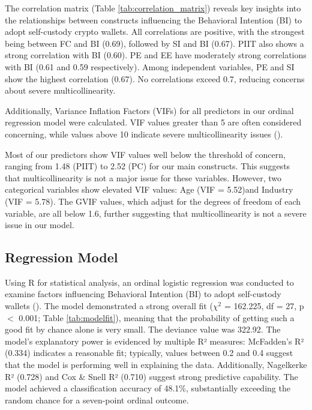 \documentclass[twocolumn]{article}
\begin{document}
The correlation matrix (Table \ref{tab:correlation_matrix}) reveals key insights into the relationships between constructs influencing the Behavioral Intention (BI) to adopt self-custody crypto wallets. All correlations are positive, with the strongest being between FC and BI (0.69), followed by SI and BI (0.67). PIIT also shows a strong correlation with BI (0.60). PE and EE have moderately strong correlations with BI (0.61 and 0.59 respectively). Among independent variables, PE and SI show the highest correlation (0.67). No correlations exceed 0.7, reducing concerns about severe multicollinearity. 

Additionally, Variance Inflation Factors (VIFs) for all predictors in our ordinal regression model were calculated. VIF values greater than 5 are often considered concerning, while values above 10 indicate severe multicollinearity issues  (\cite{cohen_applied_2003}).

Most of our predictors show VIF values well below the threshold of concern, ranging from 1.48 (PIIT) to 2.52 (PC) for our main constructs. This suggests that multicollinearity is not a major issue for these variables.
However, two categorical variables show elevated VIF values: Age (VIF = 5.52)and Industry (VIF = 5.78). The GVIF values, which adjust for the degrees of freedom of each variable, are all below 1.6, further suggesting that multicollinearity is not a severe issue in our model.


\subsection{Regression Model}

Using R for statistical analysis, an ordinal logistic regression was conducted to examine factors influencing Behavioral Intention (BI) to adopt self-custody wallets  (\cite{christensen_ordinal_2023, venables_modern_2010}). The model demonstrated a strong overall fit ($\chi^2$ = 162.225, df = 27, p $<$ 0.001; Table \ref{tab:modelfit}), meaning that the probability of getting such a good fit by chance alone is very small. The deviance value was 322.92. The model's explanatory power is evidenced by multiple R² measures: McFadden's R² (0.334) indicates a reasonable fit; typically, values between 0.2 and 0.4 suggest that the model is performing well in explaining the data. Additionally, Nagelkerke R² (0.728) and Cox \& Snell R² (0.710) suggest strong predictive capability. The model achieved a classification accuracy of 48.1\%, substantially exceeding the random chance for a seven-point ordinal outcome.
\end{document}
